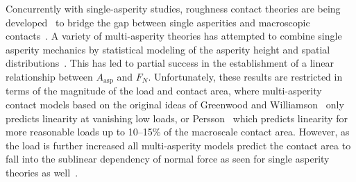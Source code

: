 
Concurrently with single-asperity studies, roughness contact theories are being developed~\cite{PhysRevLett.100.055504, Persson, GW, BUSH197587} to bridge the gap between single asperities and macroscopic contacts~\cite{mo_friction_2009}. A variety of multi-asperity theories has attempted to combine single asperity
mechanics by statistical modeling of the asperity height and spatial
distributions~\cite{CARBONE20082555}. This has led to partial success in the establishment of a linear relationship between $A_{\text{asp}}$ and $F_N$. Unfortunately, these results are restricted in terms of the magnitude of the load and contact area, where multi-asperity
contact models based on the original ideas of Greenwood and Williamson~\cite{GW}
only predicts linearity at vanishing low loads, or Persson~\cite{Persson} which predicts linearity for more reasonable loads up to 10--15\% of the macroscale contact area. However, as the load is further increased all multi-asperity models
predict the contact area to fall into the sublinear dependency of normal force
as seen for single asperity theories as well~\cite{CARBONE20082555}.








